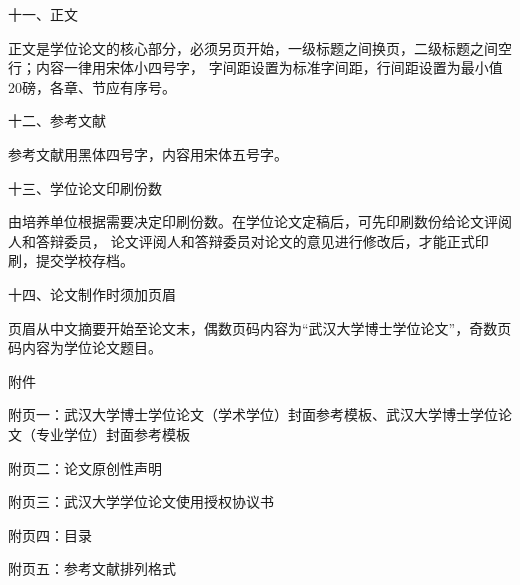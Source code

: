 {\heiti 十一、正文}

正文是学位论文的核心部分，必须另页开始，一级标题之间换页，二级标题之间空行；内容一律用宋体小四号字，
字间距设置为标准字间距，行间距设置为最小值20磅，各章、节应有序号。

{\heiti 十二、参考文献}

参考文献用黑体四号字，内容用宋体五号字。

{\heiti 十三、学位论文印刷份数}

由培养单位根据需要决定印刷份数。在学位论文定稿后，可先印刷数份给论文评阅人和答辩委员，
论文评阅人和答辩委员对论文的意见进行修改后，才能正式印刷，提交学校存档。

{\heiti 十四、论文制作时须加页眉}

页眉从中文摘要开始至论文末，偶数页码内容为“武汉大学博士学位论文”，奇数页码内容为学位论文题目。

{\heiti 附件}

附页一：武汉大学博士学位论文（学术学位）封面参考模板、武汉大学博士学位论文（专业学位）封面参考模板

附页二：论文原创性声明

附页三：武汉大学学位论文使用授权协议书

附页四：目录

附页五：参考文献排列格式

